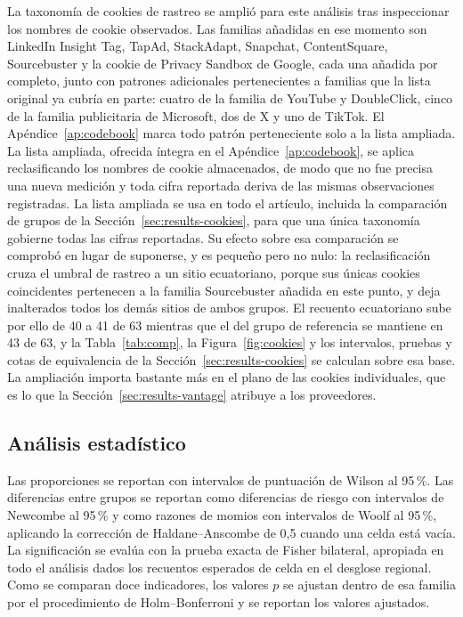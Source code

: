 \documentclass[pdflatex,sn-basic,Numbered,iicol]{sn-jnl}
\theoremstyle{thmstyleone}
\theoremstyle{thmstyletwo}
\theoremstyle{thmstylethree}
\begin{document}
La taxonom\'ia de cookies de rastreo se ampli\'o para este an\'alisis tras inspeccionar los nombres de cookie observados. Las familias a\~nadidas en ese momento son LinkedIn Insight Tag, TapAd, StackAdapt, Snapchat, ContentSquare, Sourcebuster y la cookie de Privacy Sandbox de Google, cada una a\~nadida por completo, junto con patrones adicionales pertenecientes a familias que la lista original ya cubr\'ia en parte: cuatro de la familia de YouTube y DoubleClick, cinco de la familia publicitaria de Microsoft, dos de X y uno de TikTok. El Ap\'endice~\ref{ap:codebook} marca todo patr\'on perteneciente solo a la lista ampliada. La lista ampliada, ofrecida \'integra en el Ap\'endice~\ref{ap:codebook}, se aplica reclasificando los nombres de cookie almacenados, de modo que no fue precisa una nueva medici\'on y toda cifra reportada deriva de las mismas observaciones registradas. La lista ampliada se usa en todo el art\'iculo, incluida la comparaci\'on de grupos de la Secci\'on~\ref{sec:results-cookies}, para que una \'unica taxonom\'ia gobierne todas las cifras reportadas. Su efecto sobre esa comparaci\'on se comprob\'o en lugar de suponerse, y es peque\~no pero no nulo: la reclasificaci\'on cruza el umbral de rastreo a un sitio ecuatoriano, porque sus \'unicas cookies coincidentes pertenecen a la familia Sourcebuster a\~nadida en este punto, y deja inalterados todos los dem\'as sitios de ambos grupos. El recuento ecuatoriano sube por ello de 40 a 41 de 63 mientras que el del grupo de referencia se mantiene en 43 de 63, y la Tabla~\ref{tab:comp}, la Figura~\ref{fig:cookies} y los intervalos, pruebas y cotas de equivalencia de la Secci\'on~\ref{sec:results-cookies} se calculan sobre esa base. La ampliaci\'on importa bastante m\'as en el plano de las cookies individuales, que es lo que la Secci\'on~\ref{sec:results-vantage} atribuye a los proveedores.

\subsection{An\'alisis estad\'istico}\label{sec:methods-stats}

Las proporciones se reportan con intervalos de puntuaci\'on de Wilson al 95\,\%. Las diferencias entre grupos se reportan como diferencias de riesgo con intervalos de Newcombe al 95\,\% y como razones de momios con intervalos de Woolf al 95\,\%, aplicando la correcci\'on de Haldane--Anscombe de 0,5 cuando una celda est\'a vac\'ia. La significaci\'on se eval\'ua con la prueba exacta de Fisher bilateral, apropiada en todo el an\'alisis dados los recuentos esperados de celda en el desglose regional. Como se comparan doce indicadores, los valores $p$ se ajustan dentro de esa familia por el procedimiento de Holm--Bonferroni y se reportan los valores ajustados.
\end{document}
